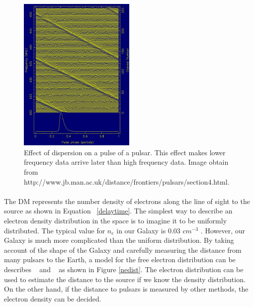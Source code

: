 \documentclass[thesis_msc.tex]{subfiles}
\begin{document}
\begin{figure}[h] \centering
\includegraphics[width=0.5\textwidth]{figures/disp.png}
\caption{Effect of dispersion on a pulse of a pulsar. This effect makes lower frequency data arrive later than high frequency data. Image obtain from http://www.jb.man.ac.uk/distance/frontiers/pulsars/section4.html.  }
\label{DMplot}
\end{figure}
   \paragraph{} The DM represents the number density of electrons along the line of sight to the source as shown in Equation ~\ref{delaytime}. The simplest way to describe an electron density distribution in the space is to imagine it to be uniformly distributed. The typical value for $n_e$ in our Galaxy is 0.03 $cm^{-3}$ \citep{ables1976hydrogen}. However, our Galaxy is much more complicated than the uniform distribution. By taking account of the shape of the Galaxy and carefully measuring the distance from many pulsars to the Earth, a model for the free electron distribution can be describes ~\citep{cordes2003ne2001} and ~\citep{yao2017new} as shown in Figure \ref{nedist}.  The electron distribution can be used to estimate the distance to the source if we know the density distribution. On the other hand, if the distance to pulsars is measured by other methods, the electron density can be decided. 
   
\end{document}
